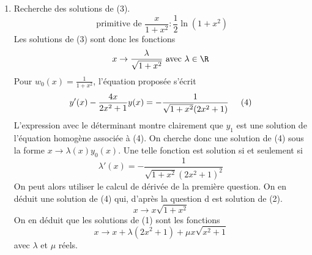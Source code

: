 \begin{enumerate}
 \item Recherche des solutions de (3). 
\begin{displaymath}
 \text{ primitive de }\frac{x}{1+x^2} : \frac{1}{2}\ln(1+x^2)
\end{displaymath}
Les solutions de (3) sont donc les fonctions 
\begin{displaymath}
 x \rightarrow \frac{\lambda}{\sqrt{1+x^2}}\text{ avec } \lambda \in \R
\end{displaymath}
Pour $w_0(x) = \frac{1}{1+x^2}$, l'équation proposée s'écrit
\begin{displaymath}
 y'(x) - \frac{4x}{2x^2+1}y(x) = -\frac{1}{\sqrt{1+x^2}(2x^2+1)}  \hspace{0.5cm} (4)
\end{displaymath}
L'expression avec le déterminant montre clairement que $y_1$ est une solution de l'équation homogène associée à (4). On cherche donc une solution de (4) sous la forme $x\rightarrow \lambda(x) y_0(x)$. Une telle fonction est solution si et seulement si
\begin{displaymath}
 \lambda'(x) = -\frac{1}{\sqrt{1+x^2}(2x^2+1)^2}
\end{displaymath}
On peut alors utiliser le calcul de dérivée de la première question. On en déduit une solution de (4) qui, d'après la question d est solution de (2). 
\begin{displaymath}
 x\rightarrow x\sqrt{1+x^2}
\end{displaymath}
On en déduit que les solutions de (1) sont les fonctions
\begin{displaymath}
 x\rightarrow x + \lambda(2x^2+1) + \mu x\sqrt{x^2+1}
\end{displaymath}
avec $\lambda$ et $\mu$ réels.
\end{enumerate}
 